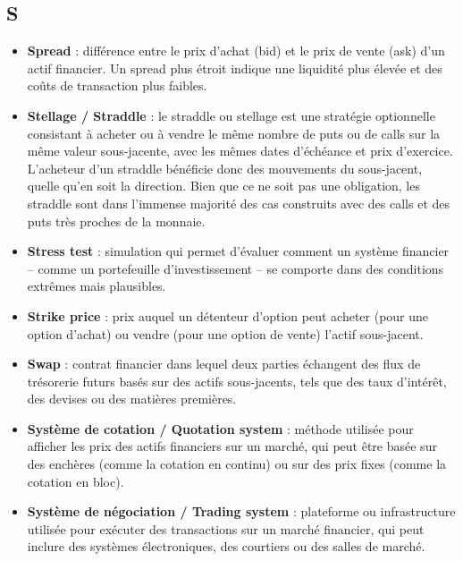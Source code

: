 \documentclass[a4paper,10pt]{article}
\begin{document}
\begin{multicols}{2}
\section*{S}
\begin{itemize}
  \item \textbf{Spread} : différence entre le prix d’achat (bid) et le prix de vente (ask) d’un actif financier. Un spread plus étroit indique une liquidité plus élevée et des coûts de transaction plus faibles.
  \item \textbf{Stellage / Straddle} : le straddle ou stellage est une stratégie optionnelle consistant à acheter ou à vendre le même nombre de puts ou de calls sur la même valeur sous-jacente, avec les mêmes dates d'échéance et prix d'exercice. L'acheteur d'un straddle bénéficie donc des mouvements du sous-jacent, quelle qu'en soit la direction. Bien que ce ne soit pas une obligation, les straddle sont dans l'immense majorité des cas construits avec des calls et des puts très proches de la monnaie.
  \item \textbf{Stress test} : simulation qui permet d'évaluer comment un système financier -- comme un portefeuille d'investissement -- se comporte dans des conditions extrêmes mais plausibles.
  \item \textbf{Strike price} : prix auquel un détenteur d’option peut acheter (pour une option d’achat) ou vendre (pour une option de vente) l’actif sous-jacent.
  \item \textbf{Swap} : contrat financier dans lequel deux parties échangent des flux de trésorerie futurs basés sur des actifs sous-jacents, tels que des taux d’intérêt, des devises ou des matières premières.
  \item \textbf{Système de cotation / Quotation system} : méthode utilisée pour afficher les prix des actifs financiers sur un marché, qui peut être basée sur des enchères (comme la cotation en continu) ou sur des prix fixes (comme la cotation en bloc).
  \item \textbf{Système de négociation / Trading system} : plateforme ou infrastructure utilisée pour exécuter des transactions sur un marché financier, qui peut inclure des systèmes électroniques, des courtiers ou des salles de marché.
\end{itemize}


\end{multicols}
\end{document}
